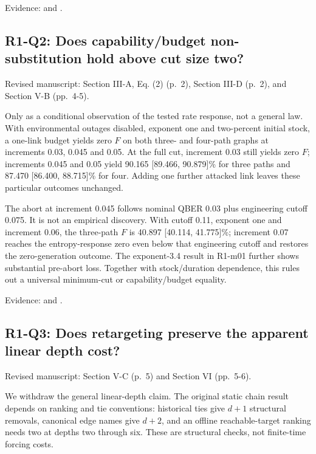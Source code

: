 Evidence:  and .

\subsection{R1-Q2: Does capability/budget non-substitution hold above cut size two?}\label{r1-q2-does-capabilitybudget-non-substitution-hold-above-cut-size-two}

Revised manuscript: Section III-A, Eq. (2) (p.~2), Section III-D (p.~2), and Section V-B (pp.~4-5).

Only as a conditional observation of the tested rate response, not a general law. With environmental outages disabled, exponent one and two-percent initial stock, a one-link budget yields zero \(F\) on both three- and four-path graphs at increments 0.03, 0.045 and 0.05. At the full cut, increment 0.03 still yields zero \(F\); increments 0.045 and 0.05 yield 90.165 {[}89.466, 90.879{]}\% for three paths and 87.470 {[}86.400, 88.715{]}\% for four. Adding one further attacked link leaves these particular outcomes unchanged.

The abort at increment 0.045 follows nominal QBER 0.03 plus engineering cutoff 0.075. It is not an empirical discovery. With cutoff 0.11, exponent one and increment 0.06, the three-path \(F\) is 40.897 {[}40.114, 41.775{]}\%; increment 0.07 reaches the entropy-response zero even below that engineering cutoff and restores the zero-generation outcome. The exponent-3.4 result in R1-m01 further shows substantial pre-abort loss. Together with stock/duration dependence, this rules out a universal minimum-cut or capability/budget equality.

Evidence:  and .

\subsection{R1-Q3: Does retargeting preserve the apparent linear depth cost?}\label{r1-q3-does-retargeting-preserve-the-apparent-linear-depth-cost}

Revised manuscript: Section V-C (p.~5) and Section VI (pp.~5-6).

We withdraw the general linear-depth claim. The original static chain result depends on ranking and tie conventions: historical ties give \(d+1\) structural removals, canonical edge names give \(d+2\), and an offline reachable-target ranking needs two at depths two through six. These are structural checks, not finite-time forcing costs.


